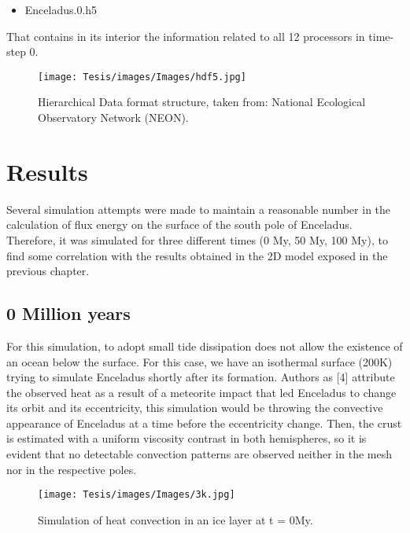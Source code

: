 \documentclass[../main.tex]{subfiles}
\begin{document}
\begin{itemize}
    \item Enceladus.0.h5 
\end{itemize}

That contains in its interior the information related to all 12 processors in time-step 0. 

\vspace{5mm}

\begin{figure}[h]
    \centering
    \texttt{[image: Tesis/images/Images/hdf5.jpg]}
    \label{fig:my_label}
    \centering
    \caption{\centering Hierarchical Data format structure, taken from: National Ecological Observatory Network (NEON).}
\end{figure}



\newpage
\section{Results}

Several simulation attempts were made to maintain a reasonable number in the calculation of flux energy on the surface of the south pole of Enceladus. Therefore, it was simulated for three different times (0 My, 50 My, 100 My), to find some correlation with the results obtained in the 2D model exposed in the previous chapter.

\subsection{0 Million years}

For this simulation, to adopt small tide dissipation does not allow the existence of an ocean below the surface. For this case, we have an isothermal surface (200K) trying to simulate Enceladus shortly after its formation. Authors as [4]  attribute the observed heat as a result of a meteorite impact that led Enceladus to change its orbit and its eccentricity, this simulation would be throwing the convective appearance of Enceladus at a time before the eccentricity change. Then, the crust is estimated with a uniform viscosity contrast in both hemispheres, so it is evident that no detectable convection patterns are observed neither in the mesh nor in the respective poles.

\vspace{10mm}
\begin{figure}[h]
    \centering
    \texttt{[image: Tesis/images/Images/3k.jpg]}
    \label{fig:my_label}
    \centering
    \caption{Simulation of heat convection in an ice layer at t = 0My.}
\end{figure}
\end{document}
